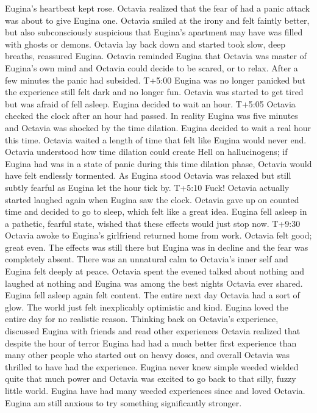 \documentclass[12pt]{book}
\begin{document}
Eugina's heartbeat kept rose. Octavia realized that the fear of had a panic attack was about to give Eugina one. Octavia smiled at the irony and felt faintly better, but also subconsciously suspicious that Eugina's apartment may have was filled with ghosts or demons. Octavia lay back down and started took slow, deep breaths, reassured Eugina. Octavia reminded Eugina that Octavia was master of Eugina's own mind and Octavia could decide to be scared, or to relax. After a few minutes the panic had subsided. T+5:00 Eugina was no longer panicked but the experience still felt dark and no longer fun. Octavia was started to get tired but was afraid of fell asleep. Eugina decided to wait an hour. T+5:05 Octavia checked the clock after an hour had passed. In reality Eugina was five minutes and Octavia was shocked by the time dilation. Eugina decided to wait a real hour this time. Octavia waited a length of time that felt like Eugina would never end. Octavia understood how time dilation could create Hell on hallucinogens; if Eugina had was in a state of panic during this time dilation phase, Octavia would have felt endlessly tormented. As Eugina stood Octavia was relaxed but still subtly fearful as Eugina let the hour tick by. T+5:10 Fuck! Octavia actually started laughed again when Eugina saw the clock. Octavia gave up on counted time and decided to go to sleep, which felt like a great idea. Eugina fell asleep in a pathetic, fearful state, wished that these effects would just stop now. T+9:30 Octavia awoke to Eugina's girlfriend returned home from work. Octavia felt good; great even. The effects was still there but Eugina was in decline and the fear was completely absent. There was an unnatural calm to Octavia's inner self and Eugina felt deeply at peace. Octavia spent the evened talked about nothing and laughed at nothing and Eugina was among the best nights Octavia ever shared. Eugina fell asleep again felt content. The entire next day Octavia had a sort of glow. The world just felt inexplicably optimistic and kind. Eugina loved the entire day for no realistic reason. Thinking back on Octavia's experience, discussed Eugina with friends and read other experiences Octavia realized that despite the hour of terror Eugina had had a much better first experience than many other people who started out on heavy doses, and overall Octavia was thrilled to have had the experience. Eugina never knew simple weeded wielded quite that much power and Octavia was excited to go back to that silly, fuzzy little world. Eugina have had many weeded experiences since and loved Octavia. Eugina am still anxious to try something significantly stronger.
\end{document}
